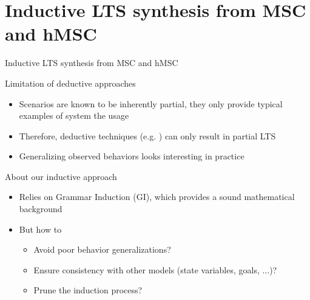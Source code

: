 \documentclass[11pt]{beamer}
\begin{document}
\section[Inductive Synthesis]{Inductive LTS synthesis from MSC and hMSC}
\begin{frame}{Inductive LTS synthesis from MSC and hMSC}
         \begin{block}{Limitation of deductive approaches}
		\begin{itemize}
			\item Scenarios are known to be inherently partial, they only provide typical examples of system the usage
			\item Therefore, deductive techniques (e.g. \cite{Uchitel03}) can only result in partial LTS
			\item Generalizing observed behaviors looks interesting in practice
		\end{itemize}
	\end{block}
         \begin{block}{About our inductive approach}
		\begin{itemize}
			\item Relies on Grammar Induction (GI), which provides a sound mathematical background
			\item But how to
			\begin{itemize}
				\item Avoid poor behavior generalizations? 
				\item Ensure consistency with other models (state variables, goals, ...)?
				\item Prune the induction process?
			\end{itemize}
		\end{itemize}
	\end{block}
\end{frame}
\end{document}
